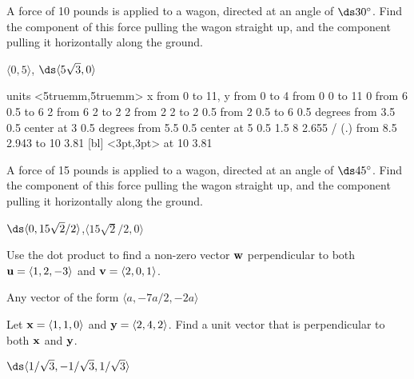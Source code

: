 \begin{theorem}
\begin{exercises}
\begin{exercise} A force of 10 pounds is applied to a wagon, directed at an
angle of $\ds 30^\circ$. Find the component of this force pulling the
wagon straight up, and the component pulling it horizontally along
the ground.
\begin{answer} $\langle 0,5\rangle$, $\ds \langle 5\sqrt3,0\rangle$
\end{answer}\end{exercise}

\figure
\vbox{\beginpicture
\normalgraphs
\ninepoint
\setcoordinatesystem units <5truemm,5truemm>
\setplotarea x from 0 to 11, y from 0 to 4
\putrule from 0 0 to 11 0
\putrule from 6 0.5 to 6 2
\putrule from 6 2 to 2 2
\putrule from 2 2 to 2 0.5
\putrule from 2 0.5 to 6 0.5
 degrees from 3.5 0.5 center at 3 0.5
 degrees from 5.5 0.5 center at 5 0.5
 1.5 8 2.655 /
\setplotsymbol ({\twelvepoint.})
\arrow <4pt> [0.35, 1] from 8.5 2.943 to 10 3.81
 [bl] <3pt,3pt> at 10 3.81
\endpicture}

\begin{exercise} A force of 15 pounds is applied to a wagon, directed at an
angle of $\ds 45^\circ$. Find the component of this force pulling the
wagon straight up, and the component pulling it horizontally along
the ground.
\begin{answer} $\ds \langle 0,15\sqrt2/2\rangle$,$\langle 15\sqrt2/2,0\rangle$
\end{answer}\end{exercise}

\begin{exercise} Use the dot product to find a non-zero vector ${\bf w}$
perpendicular to both ${\bf u}=\langle 1,2,-3\rangle$ and 
${\bf v}=\langle 2,0,1\rangle$.
\begin{answer} Any vector of the form $\langle a, -7a/2, -2a\rangle$
\end{answer}\end{exercise}

\begin{exercise} Let ${\bf x}=\langle 1,1,0 \rangle$ and ${\bf y}=\langle
2,4,2 \rangle$.  Find a unit vector that is perpendicular to both $\bf
x$ and $\bf y$.
\begin{answer} $\ds \langle 1/\sqrt3,-1/\sqrt3,1/\sqrt3\rangle$
\end{answer}\end{exercise}


\end{exercises}
\end{theorem}

